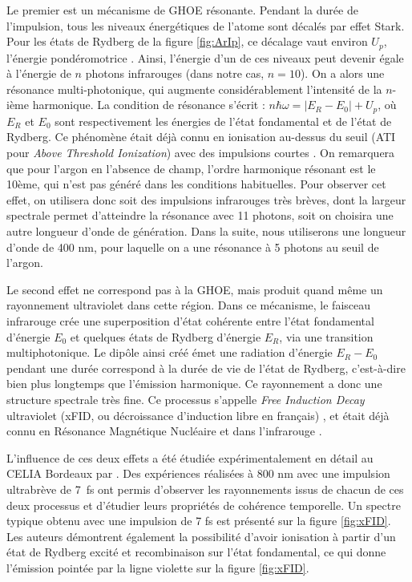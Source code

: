 Le premier est un mécanisme de GHOE résonante. Pendant la durée de l'impulsion, tous les niveaux énergétiques de l'atome sont décalés par effet Stark. Pour les états de Rydberg de la figure \ref{fig:ArIp}, ce décalage vaut environ $U_p$, l'énergie pondéromotrice . Ainsi, l'énergie d'un de ces niveaux peut devenir égale à l'énergie de $n$ photons infrarouges (dans notre cas, $n=10$). On a alors une résonance multi-photonique, qui augmente considérablement l'intensité de la $n$-ième harmonique. La condition de résonance s'écrit : $n\hbar\omega = |E_R-E_0|+U_p$, où $E_R$ et $E_0$ sont respectivement les énergies de l'état fondamental et de l'état de Rydberg. Ce phénomène était déjà connu en ionisation au-dessus du seuil (ATI pour \textit{Above Threshold Ionization}) avec des impulsions courtes . On remarquera que pour l'argon en l'absence de champ, l'ordre harmonique résonant est le 10ème, qui n'est pas généré dans les conditions habituelles. Pour observer cet effet, on utilisera donc soit des impulsions infrarouges très brèves, dont la largeur spectrale permet d'atteindre la résonance avec 11 photons, soit on choisira une autre longueur d'onde de génération. Dans la suite, nous utiliserons une longueur d'onde de 400 nm, pour laquelle on a une résonance à 5 photons au seuil de l'argon.

Le second effet ne correspond pas à la GHOE, mais produit quand même un rayonnement ultraviolet dans cette région. Dans ce mécanisme, le faisceau infrarouge crée une superposition d'état cohérente entre l'état fondamental d'énergie $E_0$ et quelques états de Rydberg d'énergie $E_R$, via une transition multiphotonique. Le dipôle ainsi créé émet une radiation d'énergie $E_R-E_0$ pendant une durée correspond à la durée de vie de l'état de Rydberg, c'est-à-dire bien plus longtemps que l'émission harmonique. Ce rayonnement a donc une structure spectrale très fine. Ce processus s'appelle \textit{Free Induction Decay} ultraviolet (xFID, ou décroissance d'induction libre en français) , et était déjà connu en Résonance Magnétique Nucléaire  et dans l'infrarouge . 

L'influence de ces deux effets a été étudiée expérimentalement en détail au CELIA Bordeaux par . Des expériences réalisées à 800 nm avec une impulsion ultrabrève de 7~fs ont permis d'observer les rayonnements issus de chacun de ces deux processus et d'étudier leurs propriétés de cohérence temporelle. Un spectre typique obtenu avec une impulsion de 7 fs est présenté sur la figure \ref{fig:xFID}. Les auteurs démontrent également la possibilité d'avoir ionisation à partir d'un état de Rydberg excité et recombinaison sur l'état fondamental, ce qui donne l'émission pointée par la ligne violette sur la figure \ref{fig:xFID}. 

